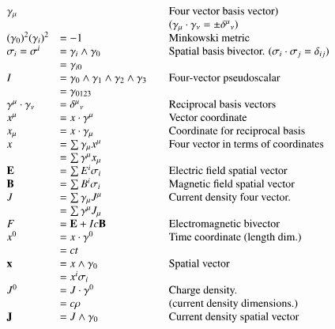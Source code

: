 \documentclass{article}
\begin{document}
\begin{equation*}
\begin{array}{l l l}
\gamma_{\mu} & & \quad \mbox{Four vector basis vector)} \\
& & \quad \mbox{($\gamma_{\mu} \cdot \gamma_{\nu} = \pm {\delta^{\mu}}_{\nu}$)} \\
{(\gamma_0)}^2 {(\gamma_i)}^2 &= -1 & \quad \mbox{Minkowski metric} \\
\sigma_i = \sigma^i &= \gamma_{i} \wedge \gamma_0 & \quad \mbox{Spatial basis bivector. ($\sigma_i \cdot \sigma_j = \delta_{ij}$)} \\
                    &= \gamma_{i0} \\
I &= \gamma_{0} \wedge \gamma_1 \wedge \gamma_{2} \wedge \gamma_3 & \quad \mbox{Four-vector pseudoscalar} \\
  &= \gamma_{0123} \\
\gamma^{\mu} \cdot \gamma_{\nu} &= {\delta^{\mu}}_{\nu} & \quad \mbox{Reciprocal basis vectors} \\
x^{\mu} &= x \cdot \gamma^{\mu} & \quad \mbox{Vector coordinate} \\
x_{\mu} &= x \cdot \gamma_{\mu} & \quad \mbox{Coordinate for reciprocal basis} \\
x &= \sum \gamma_{\mu} x^{\mu} & \quad \mbox{Four vector in terms of coordinates} \\
  &= \sum \gamma^{\mu} x_{\mu} \\
\mathbf{E} &= \sum E^i \sigma_i & \quad \mbox{Electric field spatial vector} \\
\mathbf{B} &= \sum B^i \sigma_i & \quad \mbox{Magnetic field spatial vector} \\
J &= \sum \gamma_{\mu} J^{\mu} & \quad \mbox{Current density four vector.} \\
  &= \sum \gamma^{\mu} J_{\mu} \\
F &= \mathbf{E} + I c \mathbf{B} & \quad \mbox{Electromagnetic bivector} \\
x^{0} &= x \cdot \gamma^0 & \quad \mbox{Time coordinate (length dim.)} \\
      &= c t \\
\mathbf{x} &= x \wedge \gamma_0 & \quad \mbox{Spatial vector} \\
    &= x^i \sigma_i \\
J^{0} &= J \cdot \gamma^0 & \quad \mbox{Charge density.} \\
      &= c \rho & \quad \mbox{(current density dimensions.)} \\
\mathbf{J} &= J \wedge \gamma_0 & \quad \mbox{Current density spatial vector} \\

\end{array}
\end{equation*}
\end{document}
